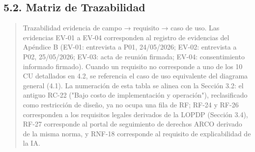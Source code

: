 \documentclass[
]{article}
\begin{document}
\subsection{5.2. Matriz de Trazabilidad}\label{matriz-de-trazabilidad}
\begin{quote}
Trazabilidad evidencia de campo → requisito → caso de uso. Las
evidencias EV-01 a EV-04 corresponden al registro de evidencias del
Apéndice B (EV-01: entrevista a P01, 24/05/2026; EV-02:
entrevista a P02, 25/05/2026; EV-03: acta de reunión firmada; EV-04:
consentimiento informado firmado). Cuando un requisito no corresponde a
uno de los 10 CU detallados en 4.2, se referencia el caso de uso
equivalente del diagrama general (4.1). La numeración de esta tabla se
alinea con la Sección 3.2: el antiguo RC-22 ("Bajo costo de
implementación y operación"), reclasificado como restricción de diseño,
ya no ocupa una fila de RF; RF-24 y RF-26 corresponden a los requisitos
legales derivados de la LOPDP (Sección 3.4), RF-27 corresponde al
portal de seguimiento de derechos ARCO derivado de la misma norma, y
RNF-18 corresponde al requisito de explicabilidad de la IA.
\end{quote}
\end{document}
